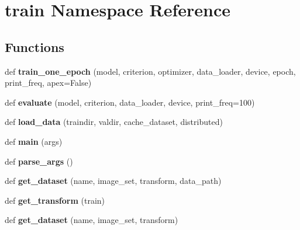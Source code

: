 \hypertarget{namespacetrain}{}\section{train Namespace Reference}
\label{namespacetrain}
\subsection*{Functions}
\begin{DoxyCompactItemize}
\item 
\mbox{\label{namespacetrain_a66be8c64105d41790967a10b9dc9bb32}} 
def {\bfseries train\+\_\+one\+\_\+epoch} (model, criterion, optimizer, data\+\_\+loader, device, epoch, print\+\_\+freq, apex=False)
\item 
\mbox{\label{namespacetrain_a596ce075ac4736d1add27ba0e7163e9b}} 
def {\bfseries evaluate} (model, criterion, data\+\_\+loader, device, print\+\_\+freq=100)
\item 
\mbox{\label{namespacetrain_a1899e423d573033cf02a7e604e811f46}} 
def {\bfseries load\+\_\+data} (traindir, valdir, cache\+\_\+dataset, distributed)
\item 
\mbox{\label{namespacetrain_a1f9040032051eb50a0cb6c02708dc2ce}} 
def {\bfseries main} (args)
\item 
\mbox{\label{namespacetrain_a88e475dfe6a39b6baf39090544ca8cb9}} 
def {\bfseries parse\+\_\+args} ()
\item 
\mbox{\label{namespacetrain_ab6a3f5736c18ae4186379e626f16e4c2}} 
def {\bfseries get\+\_\+dataset} (name, image\+\_\+set, transform, data\+\_\+path)
\item 
\mbox{\label{namespacetrain_aaf663caf8886160dc2f3142f8c8b5076}} 
def {\bfseries get\+\_\+transform} (train)
\item 
\mbox{\label{namespacetrain_a841c375775047f6d152336c37146b75d}} 
def {\bfseries get\+\_\+dataset} (name, image\+\_\+set, transform)
\item 
\mbox{\label{namespacetrain_a7a0eb86d44131e1c3cf16a1304f6e7f3}} 

\end{DoxyCompactItemize}
